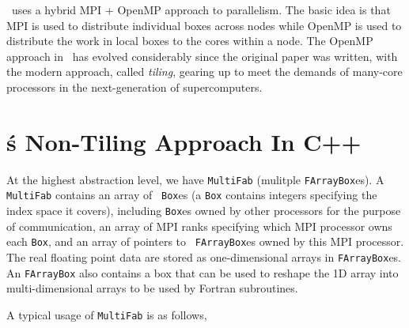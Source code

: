 \castro\ uses a hybrid MPI + OpenMP approach to parallelism.  The
basic idea is that MPI is used to distribute individual boxes across
nodes while OpenMP is used to distribute the work in local boxes to
the cores within a node.  The OpenMP approach in \castro\ has evolved
considerably since the original paper was written, with the modern
approach, called {\em tiling}, gearing up to meet the demands of
many-core processors in the next-generation of supercomputers.


\section{\boxlib\'s Non-Tiling Approach In C++}
\label{sec:boxlib0}

At the highest abstraction level, we have {\tt MultiFab} (mulitple
{\tt FArrayBox}es).  A {\tt MultiFab} contains an array of {\tt
  Box}es (a {\tt Box} contains integers specifying the index space it
covers), including {\tt Box}es owned by other processors for the
purpose of communication, an array of MPI ranks specifying which MPI
processor owns each {\tt Box}, and an array of pointers to {\tt
  FArrayBox}es owned by this MPI processor.  The real floating point
data are stored as one-dimensional arrays in {\tt FArrayBox}es.  An
{\tt FArrayBox} also contains a box that can be used to reshape the 1D
array into multi-dimensional arrays to be used by Fortran subroutines.

A typical usage of {\tt MultiFab} is as follows,

